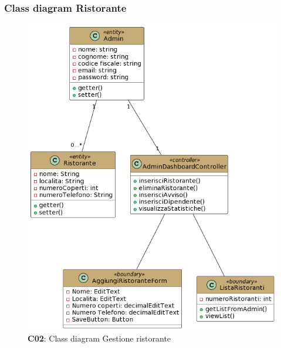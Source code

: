     \subsubsection{Class diagram Ristorante}
        \begin{figure}[H]
            \centering
            \includegraphics[scale=0.5]{assets/diagrammi/Class diagram di analisi/Gestione ristorante.png}
            \caption{\textbf{C02}: Class diagram Gestione ristorante}\label{fig:Ristorante}
        \end{figure}

